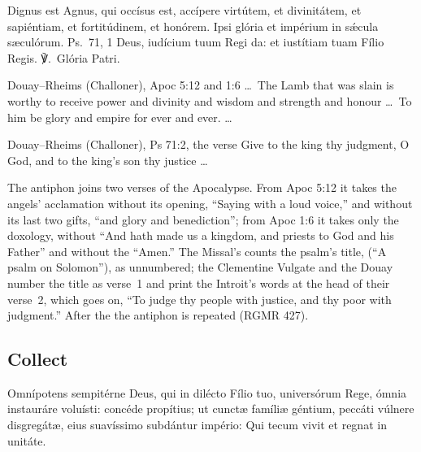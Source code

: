 
\begin{latinproper}
Dignus est Agnus, qui occísus est, accípere virtútem, et divinitátem, et
sapiéntiam, et fortitúdinem, et honórem. Ipsi glória et impérium in sǽcula
sæculórum. \textnormal{Ps.\ 71, 1} Deus, iudícium tuum Regi da: et iustítiam
tuam Fílio Regis. ℣.~Glória Patri.
\end{latinproper}

\begin{englishwitness}{Douay--Rheims (Challoner), Apoc 5:12 and 1:6}
\dots\ The Lamb that was slain is worthy to receive power and divinity and
wisdom and strength and honour \dots\ To him be glory and empire for ever and
ever. \dots
\end{englishwitness}

\begin{englishwitness}{Douay--Rheims (Challoner), Ps 71:2, the verse}
Give to the king thy judgment, O God, and to the king's son thy justice
\dots
\end{englishwitness}

\noindent The antiphon joins two verses of the Apocalypse. From Apoc 5:12 it
takes the angels' acclamation without its opening, ``Saying with a loud
voice,'' and without its last two gifts, ``and glory and benediction''; from
Apoc 1:6 it takes only the doxology, without ``And hath made us a kingdom, and
priests to God and his Father'' and without the ``Amen.'' The Missal's
 counts the psalm's title,  (``A
psalm on Solomon''), as unnumbered; the Clementine Vulgate and the Douay number
the title as verse~1 and print the Introit's words at the head of their verse~2,
which goes on, ``To judge thy people with justice, and thy poor with
judgment.'' After the  the antiphon is repeated (RGMR 427).

\subsection{Collect}
\label{proper-collect}


\begin{latinproper}
Omnípotens sempitérne Deus, qui in dilécto Fílio tuo, universórum Rege, ómnia
instauráre voluísti: concéde propítius; ut cunctæ famíliæ géntium, peccáti
vúlnere disgregátæ, eius suavíssimo subdántur império: Qui tecum vivit et
regnat in unitáte.
\end{latinproper}

